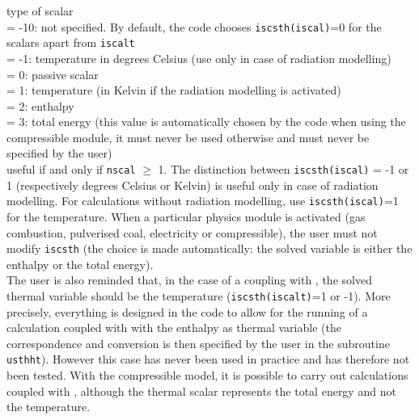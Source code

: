 {type of scalar\\
\hspace*{1.3cm}= -10: not specified. By default, the code chooses
{\tt iscsth(iscal)}=0 for the scalars apart from {\tt iscalt}\\
\hspace*{1.3cm}= -1: temperature in degrees Celsius (use only in case of
radiation modelling)\\
\hspace*{1.3cm}= 0: passive scalar\\
\hspace*{1.3cm}= 1: temperature (in Kelvin if the radiation modelling is
activated)\\
\hspace*{1.3cm}= 2: enthalpy\\
\hspace*{1.3cm}= 3: total energy (this value is automatically chosen by the code
when using the compressible module, it must never be used otherwise and must
never be specified by the user)\\
useful if and only if {\tt nscal} $\geqslant$ 1. The distinction between
{\tt iscsth(iscal)} = -1 or 1 (respectively degrees Celsius or Kelvin) is
useful only in case of radiation modelling. For calculations without
radiation modelling, use {\tt iscsth(iscal)}=1 for the temperature. When a
particular physics module is activated (gas combustion, pulverised coal,
electricity or compressible), the user must not modify {\tt iscsth} (the choice
is made automatically: the solved variable is either the enthalpy or the total energy).\\
The user is also reminded that, in the case of a coupling with
\syrthes, the solved thermal variable should be the temperature
({\tt iscsth(iscalt)}=1 or -1).
More precisely, everything is designed in the code to allow for the
running of a calculation coupled with \syrthes with the enthalpy as thermal
variable (the correspondence and conversion is then specified by the user in
the subroutine \texttt{usthht}).
However this case has never been used in practice and has therefore not been
tested. With the compressible model, it is possible to carry out calculations
coupled with \syrthes, although the thermal scalar represents the total
energy and not the temperature.}

